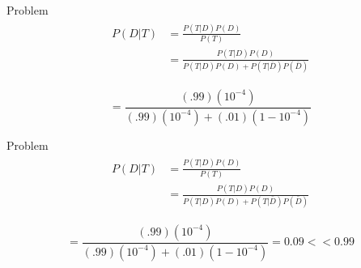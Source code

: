 \documentclass{beamer}
\begin{document}
\begin{frame}{Problem}
\begin{align}
\label{eqn*:eqlabel}
\begin{split}
P(D|T) &= \frac{P(T|D)P(D)}{P(T)}\\
&=\frac{P(T|D)P(D)}{P(T|D)P(D) + P(T|\bar{D})P(\bar{D})}
\end{split}
\end{align}

$$
=\frac{(.99)\left(10^{-4}\right)}{(.99)\left(10^{-4}\right)+(.01)\left(1-10^{-4}\right)}
$$
\end{frame}

\begin{frame}{Problem}
\begin{align}
\label{eqn*:eqlabel}
\begin{split}
P(D|T) &= \frac{P(T|D)P(D)}{P(T)}\\
&=\frac{P(T|D)P(D)}{P(T|D)P(D) + P(T|\bar{D})P(\bar{D})}
\end{split}
\end{align}

$$
=\frac{(.99)\left(10^{-4}\right)}{(.99)\left(10^{-4}\right)+(.01)\left(1-10^{-4}\right) } = 0.09 << 0.99
$$

\end{frame}
\end{document}
